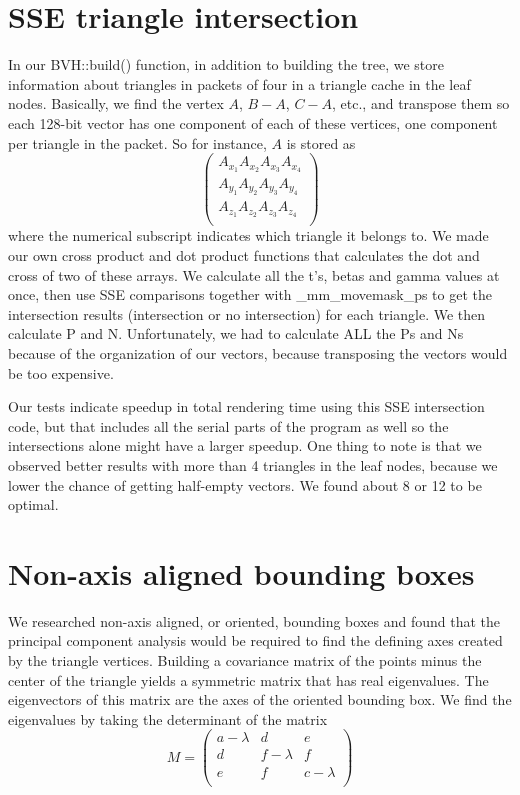 \documentclass{article} %
\begin{document}
\section{SSE triangle intersection}
In our BVH::build() function, in addition to building the tree, we store information about triangles in packets of four in a triangle cache in the leaf nodes. Basically, we find the vertex $A$, $B-A$, $C-A$, etc., and transpose them so each 128-bit vector has one component of each of these vertices, one component per triangle in the packet. So for instance, $A$ is stored as
$$
\left(
\begin{array}{cccc}
A_{x_1} A_{x_2} A_{x_3} A_{x_4}\\
A_{y_1} A_{y_2} A_{y_3} A_{y_4}\\
A_{z_1} A_{z_2} A_{z_3} A_{z_4}\\
\end{array}
\right)
$$
where the numerical subscript indicates which triangle it belongs to. We made our own cross product and dot product functions that calculates the dot and cross of two of these arrays. We calculate all the t's, betas and gamma values at once, then use SSE comparisons together with \_mm\_movemask\_ps to get the intersection results (intersection or no intersection) for each triangle. We then calculate P and N. Unfortunately, we had to calculate ALL the Ps and Ns because of the organization of our vectors, because transposing the vectors would be too expensive. 

Our tests indicate speedup in total rendering time using this SSE intersection code, but that includes all the serial parts of the program as well so the intersections alone might have a larger speedup. One thing to note is that we observed better results with more than 4 triangles in the leaf nodes, because we lower the chance of getting half-empty vectors. We found about 8 or 12 to be optimal.

\section{Non-axis aligned bounding boxes}
We researched non-axis aligned, or oriented, bounding boxes and found that the principal component analysis would be required to find the defining axes created by the triangle vertices. Building a covariance matrix of the points minus the center of the triangle yields a symmetric matrix that has real eigenvalues. The eigenvectors of this matrix are the axes of the oriented bounding box. We find the eigenvalues by taking the determinant of the matrix
$$
M=
\left(
\begin{array}{ccc}
a-\lambda & d & e\\ 
d & f-\lambda & f\\
e & f & c-\lambda\\
\end{array}
\right)
$$
\end{document}
